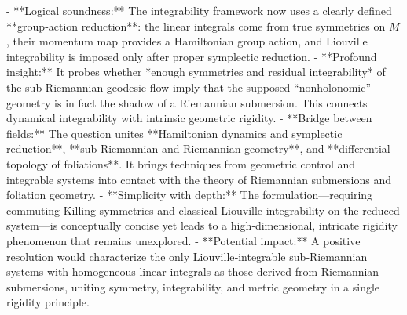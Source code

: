 - **Logical soundness:** The integrability framework now uses a clearly defined **group‑action reduction**: the linear integrals come from true symmetries on \(M\), their momentum map provides a Hamiltonian group action, and Liouville integrability is imposed only after proper symplectic reduction.  
- **Profound insight:** It probes whether *enough symmetries and residual integrability* of the sub‑Riemannian geodesic flow imply that the supposed “nonholonomic” geometry is in fact the shadow of a Riemannian submersion. This connects dynamical integrability with intrinsic geometric rigidity.  
- **Bridge between fields:** The question unites **Hamiltonian dynamics and symplectic reduction**, **sub‑Riemannian and Riemannian geometry**, and **differential topology of foliations**. It brings techniques from geometric control and integrable systems into contact with the theory of Riemannian submersions and foliation geometry.  
- **Simplicity with depth:** The formulation—requiring commuting Killing symmetries and classical Liouville integrability on the reduced system—is conceptually concise yet leads to a high‑dimensional, intricate rigidity phenomenon that remains unexplored.  
- **Potential impact:** A positive resolution would characterize the only Liouville‑integrable sub‑Riemannian systems with homogeneous linear integrals as those derived from Riemannian submersions, uniting symmetry, integrability, and metric geometry in a single rigidity principle.